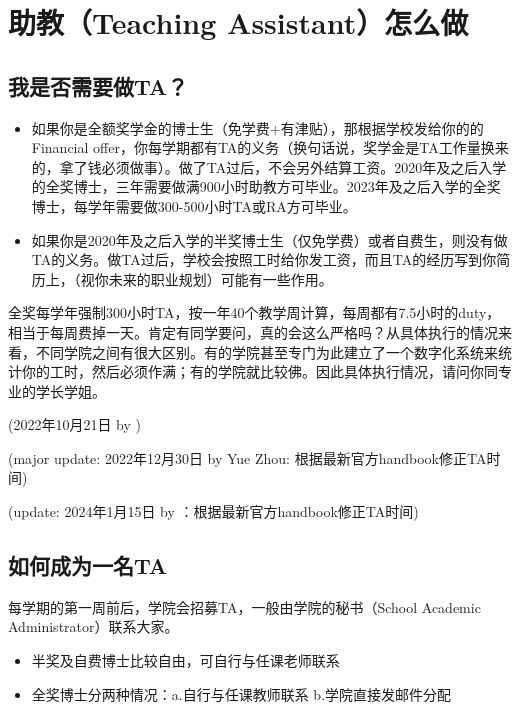 \section{助教（Teaching Assistant）怎么做}

\subsection{我是否需要做TA？}
\begin{itemize}
    \item 如果你是全额奖学金的博士生（免学费+有津贴），那根据学校发给你的的Financial offer，你每学期都有TA的义务（换句话说，奖学金是TA工作量换来的，拿了钱必须做事）。做了TA过后，不会另外结算工资。2020年及之后入学的全奖博士，三年需要做满900小时助教方可毕业。2023年及之后入学的全奖博士，每学年需要做300-500小时TA或RA方可毕业。
    \item 如果你是2020年及之后入学的半奖博士生（仅免学费）或者自费生，则没有做TA的义务。做TA过后，学校会按照工时给你发工资，而且TA的经历写到你简历上，（视你未来的职业规划）可能有一些作用。
\end{itemize}

全奖每学年强制300小时TA，按一年40个教学周计算，每周都有7.5小时的duty，相当于每周费掉一天。肯定有同学要问，真的会这么严格吗？从具体执行的情况来看，不同学院之间有很大区别。有的学院甚至专门为此建立了一个数字化系统来统计你的工时，然后必须作满；有的学院就比较佛。因此具体执行情况，请问你同专业的学长学姐。

\begin{flushright}
    (2022年10月21日 by \Wu)

    (major update: 2022年12月30日 by Yue Zhou: 根据最新官方handbook修正TA时间)

    (update: 2024年1月15日 by \Wu：根据最新官方handbook修正TA时间)
\end{flushright}

\subsection{如何成为一名TA}

每学期的第一周前后，学院会招募TA，一般由学院的秘书（School Academic Administrator）联系大家。
\begin{itemize}
    \item 半奖及自费博士比较自由，可自行与任课老师联系
    \item 全奖博士分两种情况：a.自行与任课教师联系 b.学院直接发邮件分配
\end{itemize}

